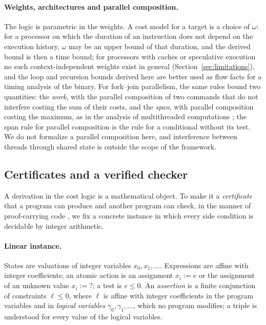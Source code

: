 \documentclass[oneside,english]{amsart}
\numberwithin{equation}{section}
\numberwithin{figure}{section}
\theoremstyle{plain}
\theoremstyle{definition}
\theoremstyle{plain}
\theoremstyle{remark}
\theoremstyle{plain}
\theoremstyle{definition}
\theoremstyle{plain}
\theoremstyle{remark}
\begin{document}
\paragraph{Weights, architectures and parallel composition.}
The logic is parametric in the weights. A cost model for a target is a choice of $\omega$: for a processor on which the duration of an instruction does not depend on the execution history, $\omega$ may be an upper bound of that duration, and the derived bound is then a time bound; for processors with caches or speculative execution no such context-independent weights exist in general (Section~\ref{sec:limitations}), and the loop and recursion bounds derived here are better used as flow facts for a timing analysis of the binary. For fork--join parallelism, the same rules bound two quantities: the \emph{work}, with the parallel composition of two commands that do not interfere costing the sum of their costs, and the \emph{span}, with parallel composition costing the maximum, as in the analysis of multithreaded computations \cite{blumofe1999scheduling}; the span rule for parallel composition is the rule for a conditional without its test. We do not formalize a parallel composition here, and interference between threads through shared state is outside the scope of the framework.

\subsection{Certificates and a verified checker}
\label{subsec:checker}

A derivation in the cost logic is a mathematical object. To make it a \emph{certificate} that a program can produce and another program can check, in the manner of proof-carrying code \cite{necula1997proof}, we fix a concrete instance in which every side condition is decidable by integer arithmetic.

\paragraph{Linear instance.}
States are valuations of integer variables $x_0, x_1, \dots$. Expressions are affine with integer coefficients; an atomic action is an assignment $x_i := e$ or the assignment of an unknown value $x_i := {?}$; a test is $e \le 0$. An \emph{assertion} is a finite conjunction of constraints $\ell \le 0$, where $\ell$ is affine with integer coefficients in the program variables and in \emph{logical variables} $\gamma_0, \gamma_1, \dots$, which no program modifies; a triple is understood for every value of the logical variables.
\end{document}
